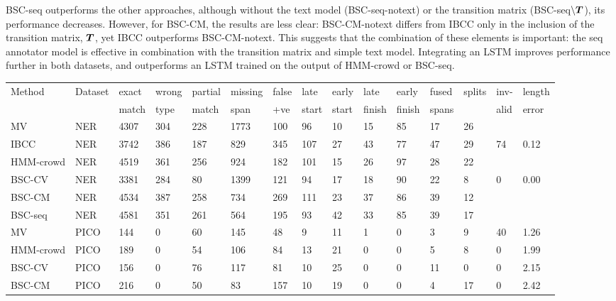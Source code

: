 BSC-seq outperforms the other approaches, although 
without the text model (BSC-seq-notext) or the transition matrix (BSC-seq$\backslash\boldsymbol T$),
its performance decreases.
However, for BSC-CM, the results are less clear: BSC-CM-notext differs from IBCC only in the 
inclusion of the transition matrix, $\boldsymbol T$, yet IBCC outperforms BSC-CM-notext.
This suggests that the combination of these elements is important: the seq annotator model is effective 
in combination with the transition matrix and simple text model.
Integrating an LSTM improves performance further in both datasets, and outperforms an LSTM trained on the output of HMM-crowd or BSC-seq.

\begin{table}[h]
\small
\centering
\setlength{\tabcolsep}{4pt}
\begin{tabular}{l l l l l l l l l l l l l l l }
\toprule
Method & Dataset & exact & wrong & partial  & missing  & false & late & early & late & early & fused & splits & inv- &  length \\ 
 & & match & type & match & span & +ve & start & start & finish & finish & spans &  & alid & error \\
\midrule
MV & NER & 4307 & 304 & 228 & 1773 & 100 & 96 & 10 & 15 & 85 & 17 & 26 \\
IBCC & NER & 3742 & 386 & 187 & 829 & 345 & 107 & 27 & 43 & 77 & 47 & 29 & 74 & 0.12 \\
HMM-crowd & NER & 4519 & 361 & 256 & 924 & 182 & 101 & 15 & 26 & 97 & 28 & 22 \\
BSC-CV & NER & 3381 & 284 & 80 & 1399 & 121 & 94 & 17 & 18 & 90 & 22 & 8 & 0 & 0.00 \\
BSC-CM & NER & 4534 & 387 & 258 & 734 & 269 & 111 & 23 & 37 & 86 & 39 & 12 \\
BSC-seq & NER & 4581 & 351 & 261 & 564 & 195 & 93 & 42 & 33 & 85 & 39 & 17 
\\
\midrule 
MV & PICO  & 144 & 0 & 60 & 145 & 48 & 9 & 11 & 1 & 0 & 3 & 9 & 40 & 1.26 \\
HMM-crowd& PICO & 189 & 0 & 54 & 106 & 84 & 13 & 21 & 0 & 0 & 5 & 8 & 0 & 1.99 \\
BSC-CV     & PICO & 156 & 0 & 76 & 117 & 81 & 10 & 25 & 0 & 0 & 11 & 0 & 0 & 2.15 \\
BSC-CM     & PICO & 216 & 0 & 50 & 83 & 157 & 10 & 19 & 0 & 0 & 4 & 17 & 0 & 2.42\\

\end{tabular}
\end{table}
